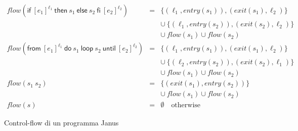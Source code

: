 \documentclass{article}
\theoremstyle{plain}
\theoremstyle{definition}
\theoremstyle{plain}
\newcommand{\ms}[1]{\mathsf{#1}}
\newcommand{\flow}{\mathit{flow}}
\newcommand{\entry}{\mathit{entry}}
\newcommand{\exit}{\mathit{exit}}
\newcommand{\false}{\mathsf{false}}
\begin{document}
\begin{figure}[t]
\small
$
\begin{array}{rcl}
\flow(\ms{if}~[e_1]^{\ell_1} ~\ms{then} ~s_1~\ms{else}~s_2~\ms{fi}~
[e_2]^{\ell_2}) & = & \{(\ell_1,\entry(s_1)),(\exit(s_1),\ell_2)\}\\
& & \cup~ \{(\ell_1,\entry(s_2)),(\exit(s_2),\ell_2)\}\\
& & \cup~ \flow(s_1)\cup\flow(s_2)\\
\flow(\ms{from}~[e_1]^{\ell_1}~\ms{do}~s_1~\ms{loop}~s_2~\ms{until}~[e_2]^{\ell_2}) & = & 
\{(\ell_1,\entry(s_1)),(\exit(s_1),\ell_2)\}\\
&  & \cup~ \{(\ell_2,\entry(s_2)),(\exit(s_2),\ell_1)\}\\
&  & 
\cup~\flow(s_1)\cup\flow(s_2)\\
\flow(s_1~s_2) & = & \{(\exit(s_1),\entry(s_2))\}\\
& & \cup~\flow(s_1) \cup\flow(s_2)\\
\flow(s) & = & \emptyset \quad \textrm{otherwise}
\end{array}
$
\caption{Control-flow di un programma Janus} \label{fig:cfg}
\end{figure}
\end{document}
